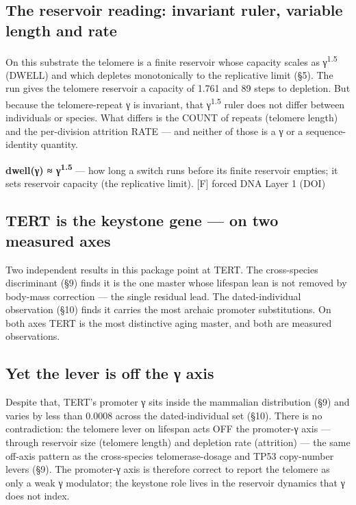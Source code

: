 \documentclass[11pt]{article}
\begin{document}
\subsection*{The reservoir reading: invariant ruler, variable length and rate}

On this substrate the telomere is a finite reservoir whose capacity scales as γ\textsuperscript{1.5} (DWELL) and which depletes monotonically to the replicative limit (§5). The run gives the telomere reservoir a capacity of 1.761 and 89 steps to depletion. But because the telomere-repeat γ is invariant, that γ\textsuperscript{1.5} ruler does not differ between individuals or species. What differs is the COUNT of repeats (telomere length) and the per-division attrition RATE — and neither of those is a γ or a sequence-identity quantity.

\begin{vpbox}\textbf{dwell(γ) ≈ γ\textsuperscript{1.5}} — how long a switch runs before its finite reservoir empties; it sets reservoir capacity (the replicative limit). [F] forced DNA Layer 1 (DOI)\end{vpbox}

\subsection*{TERT is the keystone gene — on two measured axes}

Two independent results in this package point at TERT. The cross-species discriminant (§9) finds it is the one master whose lifespan lean is not removed by body-mass correction — the single residual lead. The dated-individual observation (§10) finds it carries the most archaic promoter substitutions. On both axes TERT is the most distinctive aging master, and both are measured observations.

\subsection*{Yet the lever is off the γ axis}

Despite that, TERT's promoter γ sits inside the mammalian distribution (§9) and varies by less than 0.0008 across the dated-individual set (§10). There is no contradiction: the telomere lever on lifespan acts OFF the promoter-γ axis — through reservoir size (telomere length) and depletion rate (attrition) — the same off-axis pattern as the cross-species telomerase-dosage and TP53 copy-number levers (§9). The promoter-γ axis is therefore correct to report the telomere as only a weak γ modulator; the keystone role lives in the reservoir dynamics that γ does not index.
\end{document}

